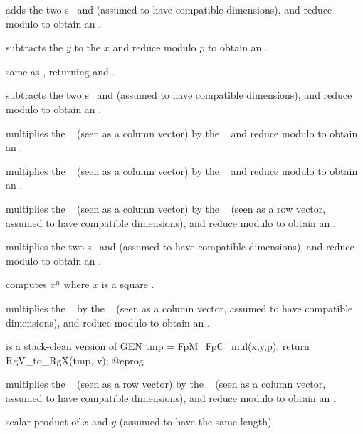  adds the two s~
and  (assumed to have compatible dimensions), and reduce modulo
 to obtain an .

 subtracts the  $y$ to
the  $x$ and reduce modulo $p$ to obtain an .

 same as , returning and
.

 subtracts the two s~
and  (assumed to have compatible dimensions), and reduce modulo
 to obtain an .

 multiplies the ~
(seen as a column vector) by the ~ and reduce modulo  to
obtain an .

 multiplies the ~
(seen as a column vector) by the ~ and reduce modulo  to
obtain an .

 multiplies the ~
(seen as a column vector) by the ~ (seen as a row vector,
assumed to have compatible dimensions), and reduce modulo  to obtain
an .

 multiplies the two s~
and  (assumed to have compatible dimensions), and reduce modulo
 to obtain an .

 computes $x^n$ where $x$ is a
square .

 multiplies the ~
by the ~ (seen as a column vector, assumed to have compatible
dimensions), and reduce modulo  to obtain an .

 is a stack-clean
version of
\bprog
  GEN tmp = FpM_FpC_mul(x,y,p);
  return RgV_to_RgX(tmp, v);
@eprog

 multiplies the ~
(seen as a row vector) by the ~ (seen as a column vector,
assumed to have compatible dimensions), and reduce modulo  to obtain
an .

 scalar product of
$x$ and $y$ (assumed to have the same length).

